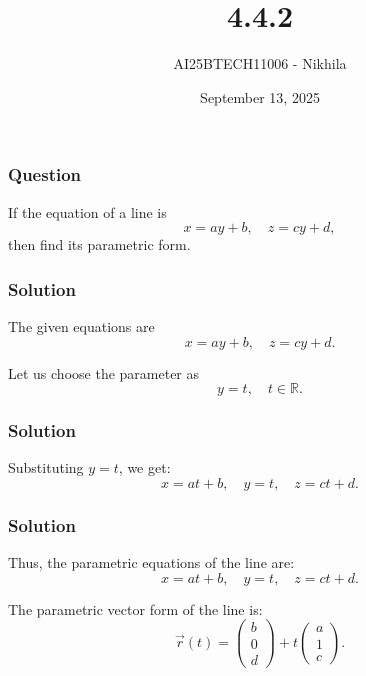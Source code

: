 \documentclass{beamer}
\title{4.4.2}
\author{AI25BTECH11006 - Nikhila}
\date{September 13, 2025}
\begin{document}
\frame{\titlepage}

\begin{frame}
\frametitle{Question}
If the equation of a line is
\[
x = ay + b, \quad z = cy + d,
\]
then find its parametric form.
\end{frame}

\begin{frame}
\frametitle{Solution}
The given equations are
\[
x = ay + b, \quad z = cy + d.
\]

Let us choose the parameter as
\[
y = t, \quad t \in \mathbb{R}.
\]
\end{frame}

\begin{frame}
\frametitle{Solution}
Substituting \(y = t\), we get:
\[
x = at + b, \quad y = t, \quad z = ct + d.
\]
\end{frame}

\begin{frame}
\frametitle{Solution}
Thus, the parametric equations of the line are:
\[
x = at + b, \quad y = t, \quad z = ct + d.
\]

The parametric vector form of the line is:
\[
\vec{r}(t) =
\begin{pmatrix}
b \\
0 \\
d
\end{pmatrix}
+
t
\begin{pmatrix}
a \\
1 \\
c
\end{pmatrix}.
\]
\end{frame}
\end{document}

